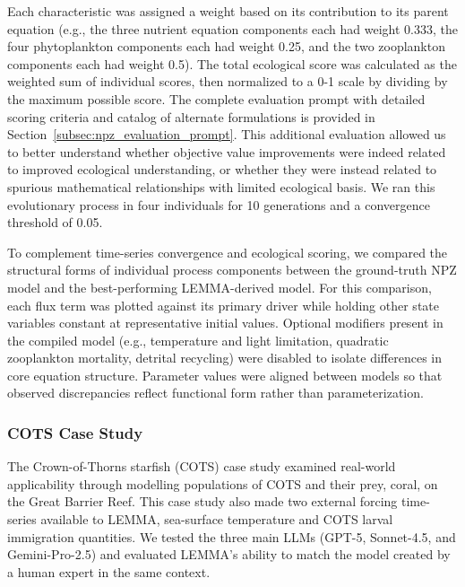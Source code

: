 Each characteristic was assigned a weight based on its contribution to its parent equation (e.g., the three nutrient equation components each had weight 0.333, the four phytoplankton components each had weight 0.25, and the two zooplankton components each had weight 0.5). The total ecological score was calculated as the weighted sum of individual scores, then normalized to a 0-1 scale by dividing by the maximum possible score. The complete evaluation prompt with detailed scoring criteria and catalog of alternate formulations is provided in Section~\ref{subsec:npz_evaluation_prompt}. This additional evaluation allowed us to better understand whether objective value improvements were indeed related to improved ecological understanding, or whether they were instead related to spurious mathematical relationships with limited ecological basis. We ran this evolutionary process in four individuals for 10 generations and a convergence threshold of 0.05.

To complement time-series convergence and ecological scoring, we compared the structural forms of individual process components between the ground-truth NPZ model and the best-performing LEMMA-derived model. For this comparison, each flux term was plotted against its primary driver while holding other state variables constant at representative initial values. Optional modifiers present in the compiled model (e.g., temperature and light limitation, quadratic zooplankton mortality, detrital recycling) were disabled to isolate differences in core equation structure. Parameter values were aligned between models so that observed discrepancies reflect functional form rather than parameterization. 

\subsubsection{COTS Case Study}

The Crown-of-Thorns starfish (COTS) case study examined real-world applicability through modelling populations of COTS and their prey, coral, on the Great Barrier Reef. This case study also made two external forcing time-series available to LEMMA, sea-surface temperature and COTS larval immigration quantities. We tested the three main LLMs (GPT-5, Sonnet-4.5, and Gemini-Pro-2.5) and evaluated LEMMA's ability to match the model created by a human expert in the same context.

